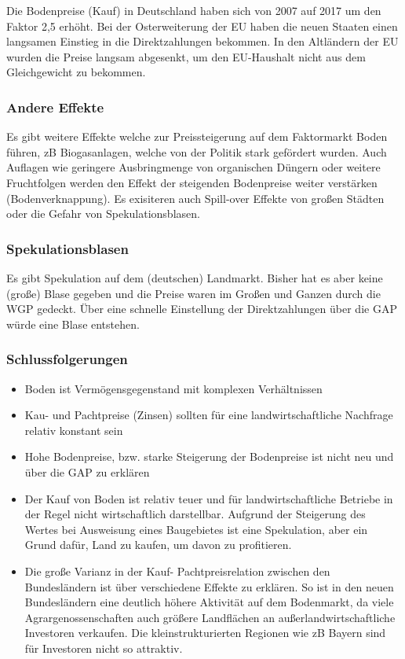 \documentclass[11pt]{scrbook}
\begin{document}
Die Bodenpreise (Kauf) in Deutschland haben sich von 2007 auf 2017 um den Faktor 2,5 erhöht.
Bei der Osterweiterung der \ac{EU} haben die neuen Staaten einen langsamen Einstieg in die Direktzahlungen bekommen.
In den Altländern der \ac{EU} wurden die Preise langsam abgesenkt, um den \ac{EU}-Haushalt nicht aus dem Gleichgewicht zu bekommen.

\subsubsection{Andere Effekte} 
Es gibt weitere Effekte welche zur Preissteigerung auf dem Faktormarkt Boden führen, zB Biogasanlagen, welche von der Politik stark gefördert wurden.
Auch Auflagen wie geringere Ausbringmenge von organischen Düngern oder weitere Fruchtfolgen werden den Effekt der steigenden Bodenpreise weiter verstärken (Bodenverknappung).
Es exisiteren auch Spill-over Effekte von großen Städten oder die Gefahr von Spekulationsblasen.

\subsubsection{Spekulationsblasen}
Es gibt Spekulation auf dem (deutschen) Landmarkt.
Bisher hat es aber keine (große) Blase gegeben und die Preise waren im Großen und Ganzen durch die \ac{WGP} gedeckt.
Über eine schnelle Einstellung der Direktzahlungen über die \ac{GAP} würde eine Blase entstehen.

\subsubsection{Schlussfolgerungen}

\begin{itemize}
	\item Boden ist Vermögensgegenstand mit komplexen Verhältnissen
	\item Kau- und Pachtpreise (Zinsen) sollten für eine landwirtschaftliche Nachfrage relativ konstant sein
	\item Hohe Bodenpreise, bzw. starke Steigerung der Bodenpreise ist nicht neu und über die \ac{GAP} zu erklären
	\item Der Kauf von Boden ist relativ teuer und für landwirtschaftliche Betriebe in der Regel nicht wirtschaftlich darstellbar.
		Aufgrund der Steigerung des Wertes bei Ausweisung eines Baugebietes ist eine Spekulation, aber ein Grund dafür, Land zu kaufen, um davon zu profitieren.
	\item Die große Varianz in der Kauf- Pachtpreisrelation zwischen den Bundesländern ist über verschiedene Effekte zu erklären.
		So ist in den neuen Bundesländern eine deutlich höhere Aktivität auf dem Bodenmarkt, da viele Agrargenossenschaften auch größere Landflächen an außerlandwirtschaftliche Investoren verkaufen.
		Die kleinstrukturierten Regionen wie zB Bayern sind für Investoren nicht so attraktiv.
\end{itemize}
\end{document}
